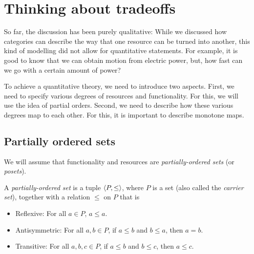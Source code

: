 \section{Thinking about tradeoffs}
So far, the discussion has been purely qualitative: While we discussed how
categories can describe the way that one resource can be turned into another,
this kind of modelling did not allow for quantitative statements. For example, it
is good to know that we can obtain motion from electric power, but, how fast can
we go with a certain amount of power?

To achieve a quantitative theory, we need to introduce two aspects.
First, we need to specify various degrees of resources and functionality.
For this, we will use the idea of partial orders.
Second, we need to describe how these various degrees map to each other.
For this, it is important to describe monotone maps.

\subsection{Partially ordered sets}

We will assume that functionality and resources
are \emph{partially-ordered sets} (or \emph{posets}).%



\begin{definition}
    A \emph{partially-ordered set} is a tuple $ \langle P, \leq\rangle$,
where $P$ is a set (also called the \emph{carrier set}), together with a
relation $\leq$ on $P$ that is
\begin{itemize}
    \item Reflexive: For all $a\in P$, $a\leq a$.
    \item Antisymmetric: For all $a,b\in P$, if $a\leq b$ and $b\leq a$, then $a=b$.
    \item Transitive: For all $a,b,c\in P$, if $a\leq b$ and $b\leq c$, then $a\leq c$.
\end{itemize}
\end{definition}


